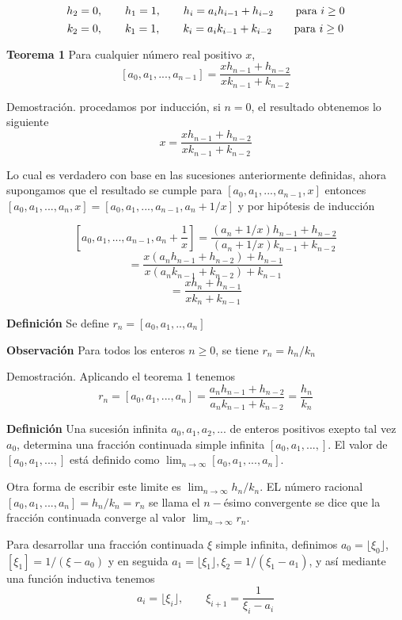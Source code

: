 \documentclass[11pt, article]{article}
\begin{document}
        \[
        h_2=0, \qquad h_1 =1, \qquad h_i=a_ih_{i-1} + h_{i-2} \qquad \textnormal{para } i\geq 0
        \]
        \[
        k_2=0, \qquad k_1 =1, \qquad k_i=a_ik_{i-1} + k_{i-2} \qquad \textnormal{para } i\geq 0
        \]
    
    \textbf{Teorema 1} Para cualquier número real positivo $x$,
        \[
        [a_0,a_1,...,a_{n-1}]=\dfrac{xh_{n-1}+h_{n-2}}{xk_{n-1}+k_{n-2}}
        \]
        
    Demostración. procedamos por inducción, si $n=0$, el resultado obtenemos lo siguiente
        \[
        x=\dfrac{xh_{n-1}+h_{n-2}}{xk_{n-1}+k_{n-2}}
        \]
        
    Lo cual es verdadero con base en las sucesiones anteriormente definidas, ahora supongamos que el resultado se cumple para $[a_0,a_1,...,a_{n-1},x]$ entonces $[a_0,a_1,...,a_n,x]=[a_0,a_1,...,a_{n-1},a_n + 1/x]$ y por hipótesis de inducción
    
        \[
        [a_0,a_1,...,a_{n-1},a_n + \dfrac{1}{x}]
            =\dfrac{(a_n+1/x)h_{n-1}+h_{n-2}}{(a_n+1/x)k_{n-1}+k_{n-2}}
            \]
            \[
            =\dfrac{x(a_nh_{n-1}+h_{n-2})+h_{n-1}}{x(a_nk_{n-1}+k_{n-2})+k_{n-1}}
            \]
            \[
            =\dfrac{xh_n+h_{n-1}}{xk_n+k_{n-1}}
        \]
        
    \textbf{Definición} Se define $r_n=[a_0,a_1,..,a_n]$
    
    \textbf{Observación} Para todos los enteros $n \geq 0$, se tiene $r_n=h_n/k_n$
    
    Demostración. Aplicando el teorema 1 tenemos
    \[
    r_n=[a_0,a_1,...,a_n]=\dfrac{a_nh_{n-1}+h_{n-2}}{a_nk_{n-1}+k_{n-2}}=\dfrac{h_n}{k_n}
    \]
    
    \textbf{Definición}  Una sucesión infinita $a_0, a_1, a_2,...$ de enteros positivos exepto tal vez $a_0$, determina una fracción continuada simple infinita $[a_0, a_1, ..., ]$. El valor de $[a_0, a_1, ..., ]$ está definido como $\lim_{n\to\infty}[a_0, a_1, ..., a_n]$.
    
    Otra forma de escribir este limite es $\lim_{n\to\infty} h_n/k_n$. EL número racional $[a_0, a_1, ...,a_n]=h_n/k_n=r_n$ se llama el $n-$ésimo convergente se dice que la fracción continuada converge al valor $\lim_{n\to\infty}r_n$.
    
    Para desarrollar una fracción continuada $\xi$ simple infinita, definimos $a_0=\lfloor \xi_0 \rfloor$, $[\xi_1]=1/(\xi-a_0)$ y en seguida $a_1= \lfloor \xi_1 \rfloor, \xi_2=1/(\xi_1-a_1)$, y así mediante una función inductiva tenemos
        \begin{equation}
        a_i=\lfloor \xi_i \rfloor, \qquad \xi_{i+1}=\dfrac{1}{\xi_i-a_i}
        \label{ecuacion_1}
        \end{equation}
\end{document}
